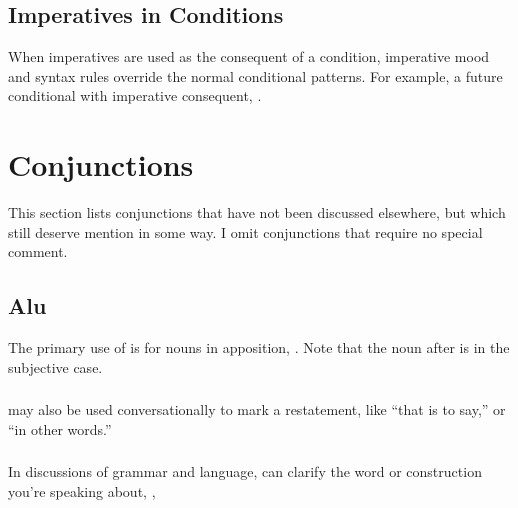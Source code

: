 \subsection{Imperatives in Conditions} When imperatives are used as
the consequent of a condition, imperative mood and syntax rules
override the normal conditional patterns.  For example, a future
conditional with imperative consequent,  .  


\section{Conjunctions}
\noindent This section lists conjunctions that have not been discussed
elsewhere, but which still deserve mention in some way.  I omit
conjunctions that require no special comment.

\subsection{Alu} The primary use of  is for nouns in
apposition,  .  Note
that the noun after  is in the subjective case.
\label{syn:conj:alu}

\subsubsection{}  may also be used conversationally to mark a
restatement, like ``that is to say,'' or ``in other words.''
 

\subsubsection{} In discussions of grammar and language,  can
clarify the word or construction you're speaking about,
,
 

